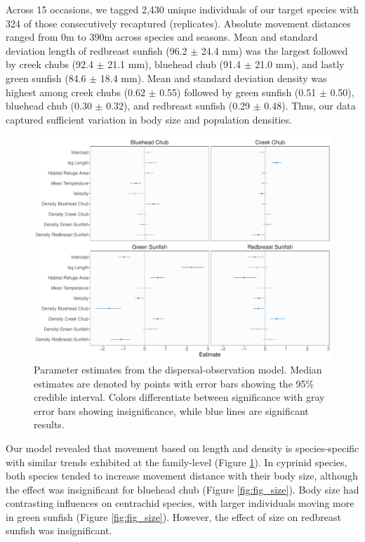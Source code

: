 \documentclass[11pt, class=article, crop=false]{standalone}
\begin{document}
Across 15 occasions, we tagged 2,430 unique individuals of our target species with 324 of those consecutively recaptured (replicates). Absolute movement distances ranged from 0m to 390m across species and seasons. Mean and standard deviation length of redbreast sunfish (96.2 $\pm$ 24.4 mm) was the largest followed by creek chubs (92.4 $\pm$ 21.1 mm), bluehead chub (91.4 $\pm$ 21.0 mm), and lastly green sunfish (84.6 $\pm$ 18.4 mm). Mean and standard deviation density was highest among creek chubs (0.62 $\pm$ 0.55) followed by green sunfish (0.51 $\pm$ 0.50), bluehead chub (0.30 $\pm$ 0.32), and redbreast sunfish (0.29 $\pm$ 0.48). Thus, our data captured sufficient variation in body size and population densities. 
\begin{figure}
    \centering
    \includegraphics[width=0.9\linewidth]{output/fig_est.pdf}
    \caption{Parameter estimates from the dispersal-observation model. Median estimates are denoted by points with error bars showing the 95\% credible interval. Colors differentiate between significance with gray error bars showing insignificance, while blue lines are significant results.}
    \label{fig:fig_est}
\end{figure}
Our model revealed that movement based on length and density is species-specific with similar trends exhibited at the family-level (Figure \ref{fig:fig_est}). In cyprinid species, both species tended to increase movement distance with their body size, although the effect was insignificant for bluehead chub (Figure \ref{fig:fig_size}). Body size had contrasting influences on centrachid species, with larger individuals moving more in green sunfish (Figure \ref{fig:fig_size}). However, the effect of size on redbreast sunfish was insignificant.
\end{document}
